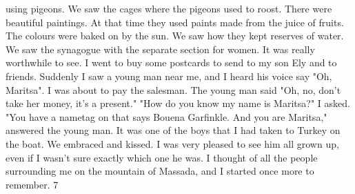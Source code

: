 using pigeons.
We saw the cages where the pigeons used to roost.
There 
were beautiful paintings.
At that time they used paints made from the 
juice of fruits.
The colours were baked on by the sun.
We saw how they 
kept reserves of water.
We saw the synagogue with the separate section 
for women.
It was really worthwhile to see.
I went to buy some postcards to send to my son Ely and to friends.
Suddenly I saw a young man near me, and I heard his voice say "Oh, Maritsa".
I was about to pay the salesman.
The young man said "Oh, no, don't take her money, it's a present."
"How do you know my name is Maritsa?"
I asked.
"You have a nametag on that says Bouena Garfinkle.
And you are Maritsa," answered the young man.
It was one of the boys that I had taken to Turkey on the boat.
We embraced and kissed.
I was very pleased to see him all grown up, even if I wasn't sure exactly which one he was.
I 
thought of all the people surrounding me on the mountain of Massada, and 
I started once more to remember.
7 

